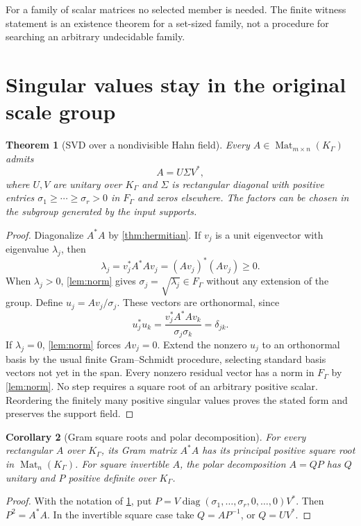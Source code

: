\documentclass[11pt,letterpaper]{article}
\numberwithin{equation}{section}
\newtheorem{theorem}{Theorem}[section]
\newtheorem{corollary}[theorem]{Corollary}
\theoremstyle{definition}
\theoremstyle{remark}
\newcommand{\Mat}{\operatorname{Mat}}
\newcommand{\diag}{\operatorname{diag}}
\newcommand{\KG}{K_{\Gamma}}
\newcommand{\FG}{F_{\Gamma}}
\begin{document}
For a family of scalar matrices no selected member is needed. The finite
witness statement is an existence theorem for a set-sized family, not a
procedure for searching an arbitrary undecidable family.

\section{Singular values stay in the original scale group}
\label{sec:svd}

\begin{theorem}[SVD over a nondivisible Hahn field]\label{thm:svd}
Every $A\in\Mat_{m\times n}(\KG)$ admits
\[
 A=U\Sigma V^*,
\]
where $U,V$ are unitary over $\KG$ and $\Sigma$ is rectangular diagonal with
positive entries $\sigma_1\ge\cdots\ge\sigma_r>0$ in $\FG$ and zeros
elsewhere. The factors can be chosen in the subgroup generated by the input
supports.
\end{theorem}
\begin{proof}
Diagonalize $A^*A$ by \cref{thm:hermitian}. If $v_j$ is a unit eigenvector
with eigenvalue $\lambda_j$, then
\[
 \lambda_j=v_j^*A^*Av_j=(Av_j)^*(Av_j)\ge0.
\]
When $\lambda_j>0$, \cref{lem:norm} gives
$\sigma_j=\sqrt{\lambda_j}\in\FG$ without any extension of the group.
Define $u_j=Av_j/\sigma_j$. These vectors are orthonormal, since
\[
 u_j^*u_k=\frac{v_j^*A^*Av_k}{\sigma_j\sigma_k}=\delta_{jk}.
\]
If $\lambda_j=0$, \cref{lem:norm} forces $Av_j=0$. Extend the nonzero $u_j$
to an orthonormal basis by the usual finite Gram--Schmidt procedure, selecting
standard basis vectors not yet in the span. Every nonzero residual vector
has a norm in $\FG$ by \cref{lem:norm}. No step requires a square root of
an arbitrary positive scalar. Reordering the finitely many positive singular
values proves the stated form and preserves the support field.
\end{proof}

\begin{corollary}[Gram square roots and polar decomposition]\label{cor:gramroot}
For every rectangular $A$ over $\KG$, its Gram matrix $A^*A$ has its principal
positive square root in $\Mat_n(\KG)$. For square invertible $A$, the polar
decomposition $A=QP$ has $Q$ unitary and $P$ positive definite over $\KG$.
\end{corollary}
\begin{proof}
With the notation of \cref{thm:svd}, put
$P=V\diag(\sigma_1,\ldots,\sigma_r,0,\ldots,0)V^*$.
Then $P^2=A^*A$. In the invertible square case take $Q=AP^{-1}$, or $Q=UV^*$.
\end{proof}
\end{document}
